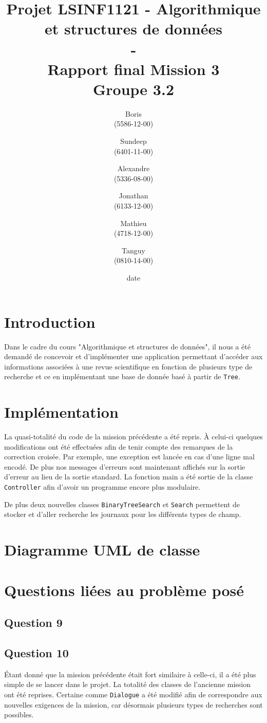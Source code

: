 \documentclass[11pt]{article}
\title{\textbf{Projet LSINF1121 -  Algorithmique et structures de données\\ - \\ Rapport final Mission 3} \\ {\large Groupe 3.2}}
\author{Boris \bsc{Dehem} \\(5586-12-00)\and Sundeep \bsc{Dhillon} \\(6401-11-00)\and Alexandre \bsc{Hauet} \\ (5336-08-00) \and Jonathan \bsc{Powell}\\(6133-12-00)\and Mathieu \bsc{Rosar} \\ (4718-12-00)\and Tanguy \bsc{Vaessen} \\ (0810-14-00)}
\date{date}
\date{\vspace*{25mm}
\texttt{[image: logo.jpg]}\\
		\vspace*{30mm}
		\begin{center}
		Année académique 2014-2015 \\	
		\end{center}}
\begin{document}
\thispagestyle{empty}

\maketitle
\thispagestyle{empty}

\newpage
\setcounter{tocdepth}{3}
\setcounter{page}{1}
\section{Introduction}

Dans le cadre du cours "Algorithmique et structures de données", il nous a été demandé de concevoir et d'implémenter une application permettant d'accéder aux informations
associées à une revue scientifique en fonction de plusieurs type de recherche et ce en implémentant une base de donnée basé à partir de \verb+Tree+.

\section{Implémentation}

La quasi-totalité du code de la mission précédente a été repris. À celui-ci quelques modifications ont été effectuées afin de tenir compte des remarques de la correction croisée. Par exemple, une exception est lancée en cas d'une ligne mal encodé. De plus nos messages d'erreurs sont maintenant affichés sur la sortie d'erreur au lieu de la sortie standard. La fonction main a été sortie de la classe \verb+Controller+ afin d'avoir un programme encore plus modulaire.

De plus deux nouvelles classes \verb+BinaryTreeSearch+ et \verb+Search+ permettent de stocker et d'aller recherche les journaux pour les différents types de champ.

\section{Diagramme UML de classe}

\section{Questions liées au problème posé}
\subsection*{Question 9}

\subsection*{Question 10}
Étant donné que la mission précédente était fort similaire à celle-ci, il a été plus simple de se lancer dans le projet. 
La totalité des classes de l'ancienne mission ont été reprises. Certaine comme \verb+Dialogue+ a été modifié afin de correspondre aux nouvelles exigences de la mission, car désormais plusieurs types de recherches sont possibles. 
\end{document}
